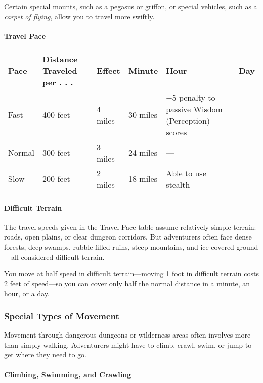 \documentclass[
]{article}
\begin{document}
Certain special mounts, such as a pegasus or griffon, or special
vehicles, such as a \emph{carpet of flying}, allow you to travel more
swiftly.

\hypertarget{travel-pace-1}{%
\paragraph{Travel Pace}\label{travel-pace-1}}

\begin{longtable}[]{@{}llllll@{}}
\toprule
Pace & Distance Traveled per . . . & Effect & Minute & Hour &
Day\tabularnewline
\midrule
\endhead
Fast & 400 feet & 4 miles & 30 miles & −5 penalty to passive Wisdom
(Perception) scores &\tabularnewline
Normal & 300 feet & 3 miles & 24 miles & --- &\tabularnewline
Slow & 200 feet & 2 miles & 18 miles & Able to use stealth
&\tabularnewline
\bottomrule
\end{longtable}

\hypertarget{difficult-terrain}{%
\paragraph{Difficult Terrain}\label{difficult-terrain}}

The travel speeds given in the Travel Pace table assume relatively
simple terrain: roads, open plains, or clear dungeon corridors. But
adventurers often face dense forests, deep swamps, rubble-filled ruins,
steep mountains, and ice-covered ground---all considered difficult
terrain.

You move at half speed in difficult terrain---moving 1 foot in difficult
terrain costs 2 feet of speed---so you can cover only half the normal
distance in a minute, an hour, or a day.

\hypertarget{special-types-of-movement}{%
\subsubsection{Special Types of
Movement}\label{special-types-of-movement}}

Movement through dangerous dungeons or wilderness areas often involves
more than simply walking. Adventurers might have to climb, crawl, swim,
or jump to get where they need to go.

\hypertarget{climbing-swimming-and-crawling}{%
\paragraph{Climbing, Swimming, and
Crawling}\label{climbing-swimming-and-crawling}}
\end{document}
